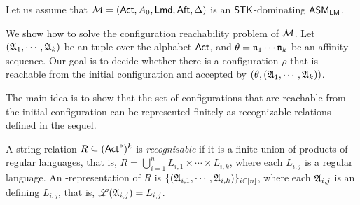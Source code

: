 


Let us assume that ${\mathcal{M} }=({\sf Act}, A_0, {\sf Lmd}, {\sf Aft}, \Delta)$ is an ${\sf STK}$-dominating $\textsf{ASM}_\textsf{LM}$.

We show how to solve the configuration reachability problem of ${\mathcal{M} }$.  
Let $({\mathfrak{A} }_1,\cdots,{\mathfrak{A} }_k)$ be an {\NFA} tuple over the alphabet ${\sf Act}$, and $\theta = \mathfrak{n}_1\cdots\mathfrak{n}_k$ be an affinity sequence. 
Our goal is to decide whether there is a configuration $\rho$ that is reachable from the initial configuration and accepted by $(\theta, ({\mathfrak{A} }_1,\cdots,{\mathfrak{A} }_k))$.

The main idea is to show that the set of configurations that are reachable from the initial configuration can be represented finitely as recognizable relations defined in the sequel. 

\begin{definition}
A string relation $R \subseteq ({\sf Act}^*)^k$ is \emph{recognisable}  if it is a finite union of products of regular languages, that is, $R=\bigcup \limits_{i =1 }^n L_{i,1} \times \cdots \times L_{i, k}$, where each $L_{i,j}$ is a regular language. An {\NFA}-representation of $R$ is $\{({\mathfrak{A} }_{i,1},\cdots,{\mathfrak{A} }_{i,k})\}_{i\in[n]}$, where each ${\mathfrak{A} }_{i,j}$ is an {\NFA} defining $L_{i,j}$, that is, ${\mathscr{L} }({\mathfrak{A} }_{i,j}) = L_{i,j}$.
\end{definition}

